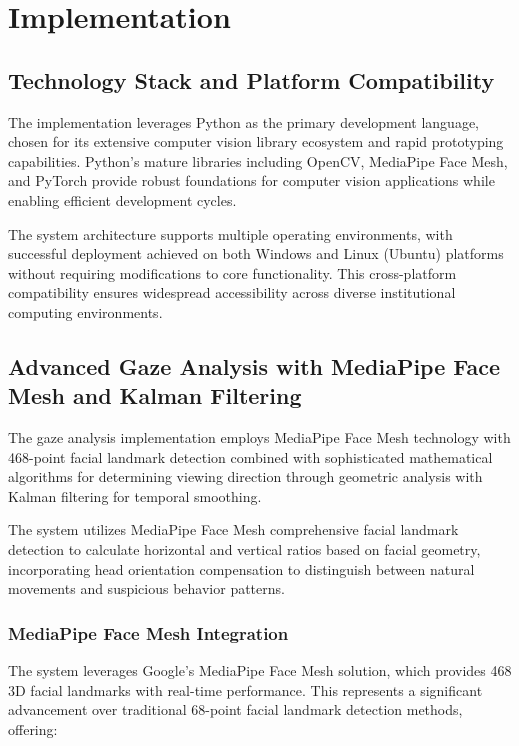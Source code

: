 \documentclass[conference]{IEEEtran}
\begin{document}
\section{Implementation}

\subsection{Technology Stack and Platform Compatibility}

The implementation leverages Python as the primary development language, chosen for its 
extensive computer vision library ecosystem and rapid prototyping capabilities. Python's 
mature libraries including OpenCV, MediaPipe Face Mesh, and PyTorch provide robust 
foundations for computer vision applications while enabling efficient development cycles.

The system architecture supports multiple operating environments, with successful 
deployment achieved on both Windows and Linux (Ubuntu) platforms without requiring 
modifications to core functionality. This cross-platform compatibility ensures 
widespread accessibility across diverse institutional computing environments.

\subsection{Advanced Gaze Analysis with MediaPipe Face Mesh and Kalman Filtering}

The gaze analysis implementation employs MediaPipe Face Mesh technology with 468-point 
facial landmark detection combined with sophisticated mathematical algorithms for 
determining viewing direction through geometric analysis with Kalman filtering for 
temporal smoothing\cite{aung2022real,jeong2014kalman,li2020hksiamfc}. 

The system utilizes MediaPipe Face Mesh comprehensive facial landmark detection to 
calculate horizontal and vertical ratios based on facial geometry, incorporating head 
orientation compensation to distinguish between natural movements and suspicious 
behavior patterns\cite{jakhete2024comprehensive}.

\subsubsection{MediaPipe Face Mesh Integration}

The system leverages Google's MediaPipe Face Mesh solution, which provides 468 3D 
facial landmarks with real-time performance. This represents a significant advancement 
over traditional 68-point facial landmark detection methods, offering:
\end{document}
